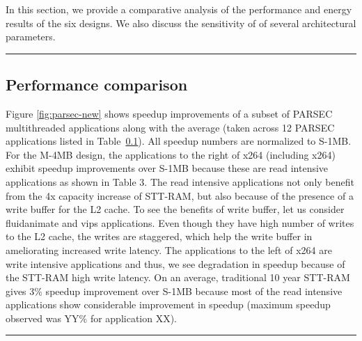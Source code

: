 In this section, we provide a comparative analysis of the performance and energy results of the six designs.
We also discuss the sensitivity of of several architectural parameters.



\begin{figure*} [t]
\centering
 \hrule
 \caption{\label{fig:parsec-new} \scriptsize \bf Normalized speedup for PARSEC Applications }
\end{figure*}



\subsection {Performance comparison}
Figure \ref{fig:parsec-new} shows speedup improvements of a subset of PARSEC
multithreaded applications along with the average (taken across 12 PARSEC applications listed in Table~\ref{}).
All speedup numbers are normalized to S-1MB.
For the M-4MB design, the applications to the right of x264 (including x264) exhibit
speedup improvements over S-1MB because these are read intensive applications as shown in Table 3.
The read intensive applications not only benefit from the 4x capacity increase of STT-RAM, but also
because of the presence of a write buffer for the L2 cache.
To see the benefits of write buffer,  let us consider fluidanimate and vips applications.
Even though they have high number of writes to the L2 cache, the writes are staggered, which help the write buffer in ameliorating increased write latency.
The applications to the left of x264 are write intensive applications and thus, we see degradation in speedup
because of the STT-RAM high write latency.
On an average, traditional 10 year STT-RAM gives 3\% speedup improvement over S-1MB because most of the read
intensive applications show considerable improvement in speedup (maximum speedup observed was YY\% for application
XX).



\begin{figure*} [t]
\centering
 \hrule
 \caption{\label{fig:spec-new} \scriptsize \bf Normalized Average Instruction Throughput(IT) and Weighted Speedup(WS) for SPEC 2006 multiprogrammed mixes. }
\end{figure*}


